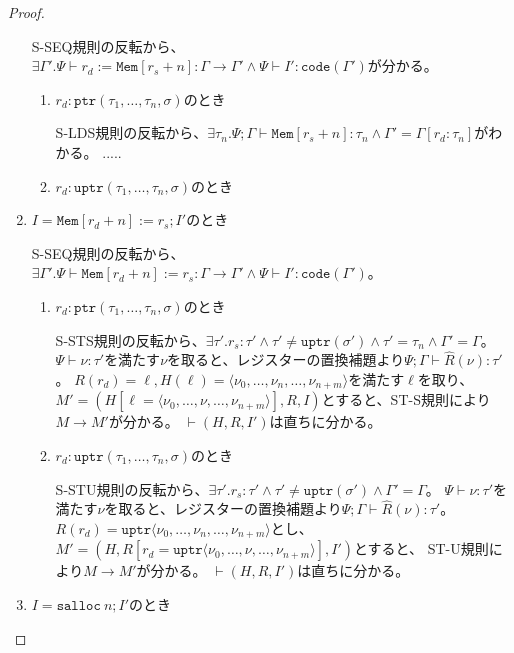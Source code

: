 \documentclass[a4paper,oneside]{ltjsarticle}
\newcommand{\code}[1]{\mathtt{code}(#1)}
\newcommand{\Mem}[1]{\mathtt{Mem}[#1]}
\newcommand{\uptr}[1]{\mathtt{uptr}(#1)}
\newcommand{\ptr}[1]{\mathtt{ptr}(#1)}
\newcommand{\vuptr}[1]{\mathtt{uptr}\langle #1\rangle}
\newcommand{\salloc}[1]{\mathtt{salloc}\ #1}
\begin{document}
\begin{proof}
\begin{enumerate}
            S-SEQ規則の反転から、$\exists\Gamma'. \Psi\vdash r_d:=\Mem{r_s+n}:\Gamma\rightarrow\Gamma' \wedge \Psi\vdash I':\code{\Gamma'}$が分かる。
            \begin{enumerate}
                \item $r_d:\ptr{\tau_1,\dots,\tau_n,\sigma}$のとき

                    S-LDS規則の反転から、$\exists\tau_n. \Psi;\Gamma\vdash \Mem{r_s+n}:\tau_n\wedge \Gamma'=\Gamma[r_d:\tau_n]$がわかる。
                    .....
                \item $r_d:\uptr{\tau_1,\dots,\tau_n,\sigma}$のとき
            \end{enumerate}
        \item $I=\Mem{r_d+n}:=r_s;I'$のとき

            S-SEQ規則の反転から、$\exists\Gamma'.\Psi\vdash \Mem{r_d+n}:=r_s : \Gamma\rightarrow\Gamma' \wedge \Psi\vdash I':\code{\Gamma'}$。
            \begin{enumerate}
                \item $r_d:\ptr{\tau_1,\dots,\tau_n,\sigma}$のとき

                    S-STS規則の反転から、$\exists \tau'. r_s:\tau'\wedge \tau' \neq \uptr{\sigma'} \wedge \tau' = \tau_n\wedge \Gamma'=\Gamma$。
                    $\Psi\vdash \nu:\tau'$を満たす$\nu$を取ると、レジスターの置換補題より$\Psi;\Gamma\vdash \hat{R}(\nu):\tau'$。
                    $R(r_d)=\ell, H(\ell)=\langle \nu_0,\dots,\nu_n,\dots,\nu_{n+m}\rangle$を満たす$\ell$を取り、
                    $M'=(H[\ell=\langle \nu_0,\dots,\nu,\dots,\nu_{n+m}\rangle],R,I)$とすると、ST-S規則により$M\rightarrow M'$が分かる。
                    $\vdash (H,R,I')$は直ちに分かる。
                \item $r_d:\uptr{\tau_1,\dots,\tau_n,\sigma}$のとき

                    S-STU規則の反転から、$\exists \tau'.r_s:\tau'\wedge \tau' \neq \uptr{\sigma'}\wedge \Gamma'=\Gamma$。
                    $\Psi\vdash \nu:\tau'$を満たす$\nu$を取ると、レジスターの置換補題より$\Psi;\Gamma\vdash \hat{R}(\nu):\tau'$。
                    $R(r_d)=\vuptr{\nu_0,\dots,\nu_n,\dots,\nu_{n+m}}$とし、$M'=(H,R[r_d=\vuptr{\nu_0,\dots,\nu,\dots,\nu_{n+m}}], I')$とすると、
                    ST-U規則により$M\rightarrow M'$が分かる。
                    $\vdash (H,R,I')$は直ちに分かる。
            \end{enumerate}
        \item $I=\salloc{n};I'$のとき


\end{enumerate}
\end{proof}
\end{document}
